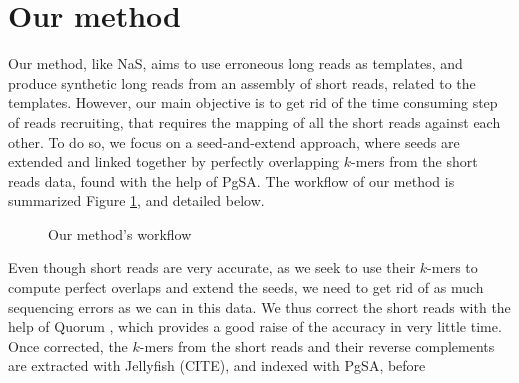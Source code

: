 \documentclass[twoside,twocolumn]{article}
\begin{document}
\section{Our method}

Our method, like NaS, aims to use erroneous long reads as templates, and produce synthetic long reads from an assembly of short reads, related to
the templates. However, our main objective is to get rid of the time consuming step of reads recruiting, that requires the mapping of all the short reads
against each other. To do so, we focus on a seed-and-extend approach, where seeds are extended and linked together by perfectly overlapping $k$-mers from the short reads data, found with the help of PgSA. The workflow of our method is summarized Figure \ref{OMWorkflow}, and detailed below. \\
\begin{figure}
	\label{OMWorkflow}
	\caption{Our method's workflow}
\end{figure}
\indent Even though short reads are very accurate, as we seek to use their $k$-mers to compute perfect overlaps and extend the seeds, we need to get rid of as much sequencing errors as we can in this data. We thus correct the short reads with the help of Quorum \cite{Marcais2015}, which provides a good raise 
of the accuracy in very little time. \\
\indent Once corrected, the $k$-mers from the short reads and their reverse complements are extracted with Jellyfish (CITE), and indexed with PgSA, before
\end{document}
